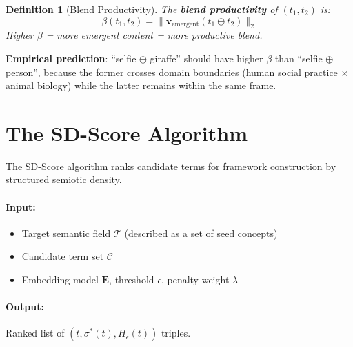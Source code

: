\documentclass[11pt,a4paper]{article}
\newtheorem{definition}{Definition}[section]
\begin{document}
\begin{definition}[Blend Productivity]
\label{def:productivity}
The \textbf{blend productivity} of $(t_1, t_2)$ is:
\[
  \beta(t_1, t_2) = \bigl\|\mathbf{v}_\text{emergent}(t_1 \oplus t_2)\bigr\|_2
\]
Higher $\beta$ = more emergent content = more productive blend.
\end{definition}

\textbf{Empirical prediction}: ``selfie $\oplus$ giraffe'' should have higher
$\beta$ than ``selfie $\oplus$ person'', because the former crosses domain
boundaries (human social practice $\times$ animal biology) while the latter
remains within the same frame.

\section{The SD-Score Algorithm}
\label{sec:algorithm}

The SD-Score algorithm ranks candidate terms for framework construction by
structured semiotic density.

\paragraph{Input:}
\begin{itemize}
  \item Target semantic field $\mathcal{T}$ (described as a set of seed concepts)
  \item Candidate term set $\mathcal{C}$
  \item Embedding model $\mathbf{E}$, threshold $\epsilon$, penalty weight $\lambda$
\end{itemize}

\paragraph{Output:} Ranked list of $(t, \sigma^*(t), H_\epsilon(t))$ triples.
\end{document}
